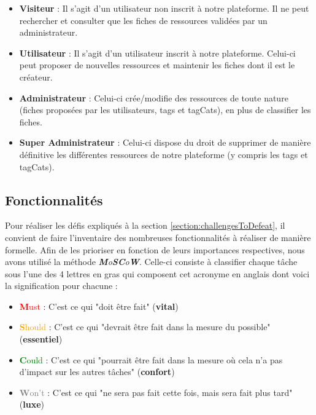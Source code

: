 \begin{itemize}
    \item \textbf{Visiteur} : Il s'agit d'un utilisateur non inscrit à notre plateforme. Il ne peut rechercher et consulter que les \glspl{fiche} de ressources validées par un administrateur.
    \item \textbf{Utilisateur} : Il s'agit d'un utilisateur  inscrit à notre plateforme. Celui-ci peut proposer de nouvelles ressources et maintenir les \glspl{fiche} dont il est le créateur.
    \item \textbf{Administrateur} : Celui-ci crée/modifie des ressources de toute nature (\glspl{fiche} proposées par les utilisateurs, \glspl{tag} et \glspl{tagCat}), en plus de classifier les \glspl{fiche}.
    \item \textbf{Super Administrateur} : Celui-ci dispose du droit de supprimer de manière définitive les différentes ressources de notre plateforme (y compris les \glspl{tag} et \glspl{tagCat}).
\end{itemize}

\subsection*{Fonctionnalités}

Pour réaliser les défis expliqués à la section \ref{section:challengesToDefeat}, il convient de faire l'inventaire des nombreuses fonctionnalités à réaliser de manière formelle.
Afin de les prioriser en fonction de leurs importances respectives, nous avons utilisé la méthode \textit{\textbf{M}o\textbf{S}\textbf{C}o\textbf{W}}\cite{MoSCoW}. Celle-ci consiste à classifier chaque tâche sous l'une des 4 lettres en gras qui composent cet acronyme en anglais dont voici la signification pour chacune :
\begin{itemize}
    \item \textcolor{red}{\textbf{M}ust} : C'est ce qui "doit être fait" (\textbf{vital})
    \item \textcolor{orange}{\textbf{S}hould} : C'est ce qui "devrait être fait dans la mesure du possible" (\textbf{essentiel})
    \item \textcolor{green}{\textbf{C}ould} : C'est ce qui "pourrait être fait dans la mesure où cela n'a pas d'impact sur les autres tâches" (\textbf{confort})
    \item \textcolor{gray}{\textbf{W}on't} : C'est ce qui "ne sera pas fait cette fois, mais sera fait plus tard" (\textbf{luxe})
\end{itemize}

